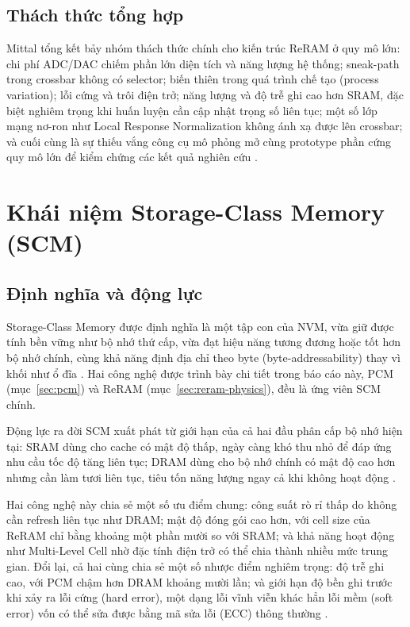 \documentclass[12pt,a4paper]{article}
\begin{document}
\subsection{Thách thức tổng hợp}

Mittal tổng kết bảy nhóm thách thức chính cho kiến trúc ReRAM ở quy mô lớn: chi phí ADC/DAC chiếm phần lớn diện tích và năng lượng hệ thống; sneak-path trong crossbar không có selector; biến thiên trong quá trình chế tạo (process variation); lỗi cứng và trôi điện trở; năng lượng và độ trễ ghi cao hơn SRAM, đặc biệt nghiêm trọng khi huấn luyện cần cập nhật trọng số liên tục; một số lớp mạng nơ-ron như Local Response Normalization không ánh xạ được lên crossbar; và cuối cùng là sự thiếu vắng công cụ mô phỏng mở cùng prototype phần cứng quy mô lớn để kiểm chứng các kết quả nghiên cứu \cite{mittal2019}.

\section{Khái niệm Storage-Class Memory (SCM)}
\label{sec:scm}

\subsection{Định nghĩa và động lực}

Storage-Class Memory được định nghĩa là một tập con của NVM, vừa giữ được tính bền vững như bộ nhớ thứ cấp, vừa đạt hiệu năng tương đương hoặc tốt hơn bộ nhớ chính, cùng khả năng định địa chỉ theo byte (byte-addressability) thay vì khối như ổ đĩa \cite{kamath2019}. Hai công nghệ được trình bày chi tiết trong báo cáo này, PCM (mục~\ref{sec:pcm}) và ReRAM (mục~\ref{sec:reram-physics}), đều là ứng viên SCM chính.

Động lực ra đời SCM xuất phát từ giới hạn của cả hai đầu phân cấp bộ nhớ hiện tại: SRAM dùng cho cache có mật độ thấp, ngày càng khó thu nhỏ để đáp ứng nhu cầu tốc độ tăng liên tục; DRAM dùng cho bộ nhớ chính có mật độ cao hơn nhưng cần làm tươi liên tục, tiêu tốn năng lượng ngay cả khi không hoạt động \cite{kamath2019}.

Hai công nghệ này chia sẻ một số ưu điểm chung: công suất rò rỉ thấp do không cần refresh liên tục như DRAM; mật độ đóng gói cao hơn, với cell size của ReRAM chỉ bằng khoảng một phần mười so với SRAM; và khả năng hoạt động như Multi-Level Cell nhờ đặc tính điện trở có thể chia thành nhiều mức trung gian. Đổi lại, cả hai cùng chia sẻ một số nhược điểm nghiêm trọng: độ trễ ghi cao, với PCM chậm hơn DRAM khoảng mười lần; và giới hạn độ bền ghi trước khi xảy ra lỗi cứng (hard error), một dạng lỗi vĩnh viễn khác hẳn lỗi mềm (soft error) vốn có thể sửa được bằng mã sửa lỗi (ECC) thông thường \cite{kamath2019}.
\end{document}
